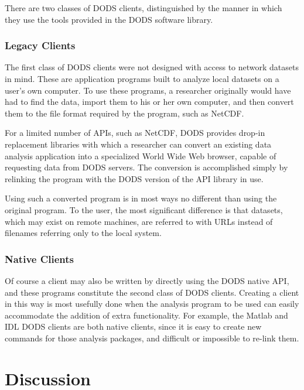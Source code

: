 \documentclass{article}
\begin{document}
There are two classes of \ac{DODS} clients, distinguished by the manner in
which they use the tools provided in the \ac{DODS} software library.

\subsubsection{Legacy Clients}
\label{legacy}

The first class of \ac{DODS} clients were not designed with access to network
datasets in mind.  These are application programs built to analyze local
datasets on a user's own computer.  To use these programs, a researcher
originally would have had to find the data, import them to his or her own
computer, and then convert them to the file format required by the program,
such as \acs{NetCDF}.

For a limited number of \ac{API}s, such as \acs{NetCDF}, \ac{DODS} provides
drop-in replacement libraries with which a researcher can convert an existing
data analysis application into a specialized World Wide Web browser, capable
of requesting data from \ac{DODS} servers.  The conversion is accomplished
simply by relinking the program with the \ac{DODS} version of the \ac{API}
library in use.

Using such a converted program is in most ways no different than using the
original program.  To the user, the most significant difference is that
datasets, which may exist on remote machines, are referred to with \acs{URL}s
instead of filenames referring only to the local system.

\subsubsection{Native Clients}

Of course a client may also be written by directly using the \ac{DODS} native
\ac{API}, and these programs constitute the second class of \ac{DODS}
clients.  Creating a client in this way is most usefully done when the
analysis program to be used can easily accommodate the addition of extra
functionality.  For example, the Matlab and IDL \ac{DODS} clients are both
native clients, since it is easy to create new commands for those analysis
packages, and difficult or impossible to re-link them.

\section{Discussion}
\label{disc}
\end{document}

